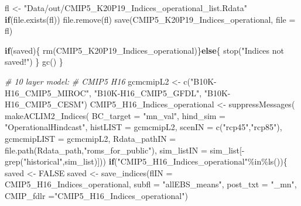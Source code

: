 \documentclass[
]{article}
\newenvironment{Shaded}{\begin{snugshade}}{\end{snugshade}}
\newcommand{\AttributeTok}[1]{\textcolor[rgb]{0.77,0.63,0.00}{#1}}
\newcommand{\CommentTok}[1]{\textcolor[rgb]{0.56,0.35,0.01}{\textit{#1}}}
\newcommand{\ConstantTok}[1]{\textcolor[rgb]{0.00,0.00,0.00}{#1}}
\newcommand{\ControlFlowTok}[1]{\textcolor[rgb]{0.13,0.29,0.53}{\textbf{#1}}}
\newcommand{\FunctionTok}[1]{\textcolor[rgb]{0.00,0.00,0.00}{#1}}
\newcommand{\NormalTok}[1]{#1}
\newcommand{\OtherTok}[1]{\textcolor[rgb]{0.56,0.35,0.01}{#1}}
\newcommand{\SpecialCharTok}[1]{\textcolor[rgb]{0.00,0.00,0.00}{#1}}
\newcommand{\StringTok}[1]{\textcolor[rgb]{0.31,0.60,0.02}{#1}}
\begin{document}
\begin{Shaded}
\begin{Highlighting}[]
\NormalTok{        fl }\OtherTok{\textless{}{-}} \StringTok{"Data/out/CMIP5\_K20P19\_Indices\_operational\_list.Rdata"}
        \ControlFlowTok{if}\NormalTok{(}\FunctionTok{file.exists}\NormalTok{(fl)) }\FunctionTok{file.remove}\NormalTok{(fl)}
        \FunctionTok{save}\NormalTok{(CMIP5\_K20P19\_Indices\_operational, }\AttributeTok{file =}\NormalTok{ fl)}
        
        \ControlFlowTok{if}\NormalTok{(saved)\{}
        \FunctionTok{rm}\NormalTok{(CMIP5\_K20P19\_Indices\_operational)\}}\ControlFlowTok{else}\NormalTok{\{}
          \FunctionTok{stop}\NormalTok{(}\StringTok{"Indices not saved!"}\NormalTok{)}
\NormalTok{        \}}
        \FunctionTok{gc}\NormalTok{()}
\NormalTok{    \}}

   \CommentTok{\# 10 layer model:}
    \CommentTok{\# CMIP5 H16}
\NormalTok{    gcmcmipL2 }\OtherTok{\textless{}{-}} \FunctionTok{c}\NormalTok{(}\StringTok{"B10K{-}H16\_CMIP5\_MIROC"}\NormalTok{,}
                   \StringTok{"B10K{-}H16\_CMIP5\_GFDL"}\NormalTok{,}
                   \StringTok{"B10K{-}H16\_CMIP5\_CESM"}\NormalTok{) }
\NormalTok{    CMIP5\_H16\_Indices\_operational }\OtherTok{\textless{}{-}} \FunctionTok{suppressMessages}\NormalTok{(}
                        \FunctionTok{makeACLIM2\_Indices}\NormalTok{(}
                        \AttributeTok{BC\_target =} \StringTok{"mn\_val"}\NormalTok{,}
                        \AttributeTok{hind\_sim  =}  \StringTok{"OperationalHindcast"}\NormalTok{,}
                        \AttributeTok{histLIST  =}\NormalTok{ gcmcmipL2,}
                        \AttributeTok{scenIN    =} \FunctionTok{c}\NormalTok{(}\StringTok{"rcp45"}\NormalTok{,}\StringTok{"rcp85"}\NormalTok{),}
                        \AttributeTok{gcmcmipLIST =}\NormalTok{ gcmcmipL2,}
                        \AttributeTok{Rdata\_pathIN =} \FunctionTok{file.path}\NormalTok{(Rdata\_path,}\StringTok{"roms\_for\_public"}\NormalTok{),}
                        \AttributeTok{sim\_listIN =}\NormalTok{ sim\_list[}\SpecialCharTok{{-}}\FunctionTok{grep}\NormalTok{(}\StringTok{"historical"}\NormalTok{,sim\_list)]))}
    \ControlFlowTok{if}\NormalTok{(}\StringTok{"CMIP5\_H16\_Indices\_operational"}\SpecialCharTok{\%in\%}\FunctionTok{ls}\NormalTok{())\{}
\NormalTok{      saved }\OtherTok{\textless{}{-}} \ConstantTok{FALSE}
\NormalTok{      saved }\OtherTok{\textless{}{-}} \FunctionTok{save\_indices}\NormalTok{(}\AttributeTok{flIN =}\NormalTok{ CMIP5\_H16\_Indices\_operational, }
                   \AttributeTok{subfl =} \StringTok{"allEBS\_means"}\NormalTok{,}
                   \AttributeTok{post\_txt =} \StringTok{"\_mn"}\NormalTok{,}
                   \AttributeTok{CMIP\_fdlr =}\StringTok{"CMIP5\_H16\_Indices\_operational"}\NormalTok{)}
     

\end{Highlighting}
\end{Shaded}
\end{document}
